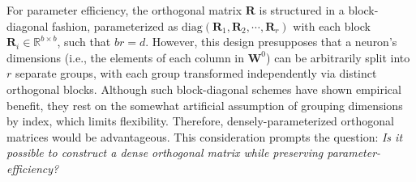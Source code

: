 For parameter efficiency, the orthogonal matrix $\bm{R}$ is structured in a block-diagonal fashion, parameterized as $\text{diag}(\bm{R}_1,\bm{R}_2,\cdots,\bm{R}_r)$ with each block $\bm{R}_i\in\mathbb{R}^{b\times b}$, such that $br=d$. However, this design presupposes that a neuron's dimensions (i.e., the elements of each column in $\bm{W}^0$) can be arbitrarily split into $r$ separate groups, with each group transformed independently via distinct orthogonal blocks. Although such block-diagonal schemes have shown empirical benefit, they rest on the somewhat artificial assumption of grouping dimensions by index, which limits flexibility. Therefore, densely-parameterized orthogonal matrices would be advantageous. This consideration prompts the question: \emph{Is it possible to construct a dense orthogonal matrix while preserving parameter-efficiency?}


